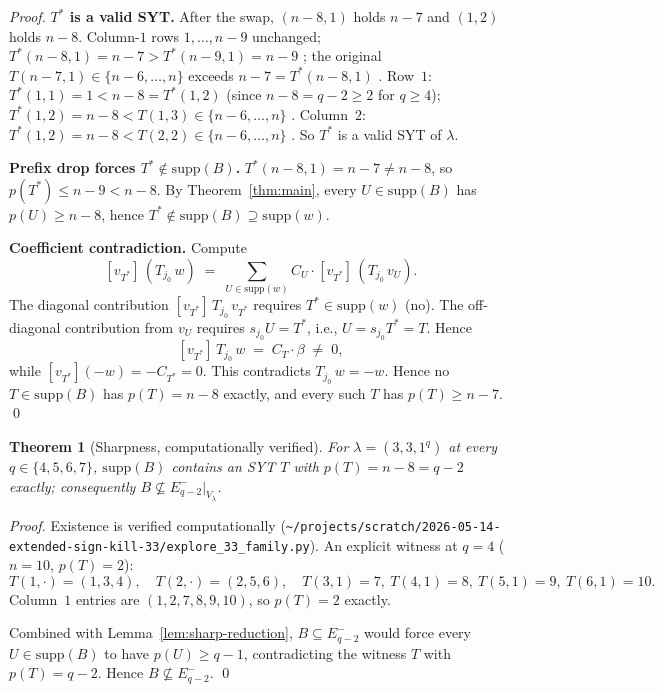 \documentclass[11pt]{article}
\newtheorem{theorem}{Theorem}
\theoremstyle{definition}
\newcommand{\supp}{\mathrm{supp}}
\begin{document}
\begin{proof}
\medskip\textbf{$T^*$ is a valid SYT.}  After the swap, $(n - 8, 1)$
holds $n - 7$ and $(1, 2)$ holds $n - 8$.  Column-$1$ rows $1, \ldots,
n - 9$ unchanged; $T^*(n - 8, 1) = n - 7 > T^*(n - 9, 1) = n - 9$
\checkmark; the original $T(n - 7, 1) \in \{n - 6, \ldots, n\}$ exceeds
$n - 7 = T^*(n - 8, 1)$ \checkmark.  Row~$1$: $T^*(1, 1) = 1 <
n - 8 = T^*(1, 2)$ \checkmark (since $n - 8 = q - 2 \ge 2$ for $q \ge 4$);
$T^*(1, 2) = n - 8 < T(1, 3) \in \{n - 6, \ldots, n\}$ \checkmark.
Column~$2$: $T^*(1, 2) = n - 8 < T(2, 2) \in \{n - 6, \ldots, n\}$
\checkmark.  So $T^*$ is a valid SYT of $\lambda$.

\medskip\textbf{Prefix drop forces $T^* \notin \supp(B)$.}
$T^*(n - 8, 1) = n - 7 \ne n - 8$, so $p(T^*) \le n - 9 < n - 8$.  By
Theorem~\ref{thm:main}, every $U \in \supp(B)$ has $p(U) \ge n - 8$,
hence $T^* \notin \supp(B) \supseteq \supp(w)$.

\medskip\textbf{Coefficient contradiction.}  Compute
\[
   [v_{T^*}]\,(T_{j_0}\,w)
   \;=\; \sum_{U \in \supp(w)} C_U \cdot [v_{T^*}]\,(T_{j_0}\,v_U).
\]
The diagonal contribution $[v_{T^*}]\,T_{j_0}\,v_{T^*}$ requires $T^*
\in \supp(w)$ (no).  The off-diagonal contribution from $v_U$ requires
$s_{j_0} U = T^*$, i.e., $U = s_{j_0} T^* = T$.  Hence
\[
   [v_{T^*}]\,T_{j_0}\,w \;=\; C_T \cdot \beta \;\ne\; 0,
\]
while $[v_{T^*}](-w) = -C_{T^*} = 0$.  This contradicts
$T_{j_0}\,w = -w$.  Hence no $T \in \supp(B)$ has $p(T) = n - 8$
exactly, and every such $T$ has $p(T) \ge n - 7$.
\qed
\end{proof}

\begin{theorem}[Sharpness, computationally verified]\label{thm:sharp}
For $\lambda = (3, 3, 1^q)$ at every $q \in \{4, 5, 6, 7\}$,
$\supp(B)$ contains an SYT $T$ with $p(T) = n - 8 = q - 2$ exactly;
consequently $B \not\subseteq E_{q-2}^-|_{V_\lambda}$.
\end{theorem}

\begin{proof}
Existence is verified computationally
(\texttt{\textasciitilde/projects/scratch/2026-05-14-extended-sign-kill-33/explore\_33\_family.py}).
An explicit witness at $q = 4$ ($n = 10$, $p(T) = 2$):
\[
   T(1, \cdot) = (1, 3, 4),\quad
   T(2, \cdot) = (2, 5, 6),\quad
   T(3, 1) = 7,\ T(4, 1) = 8,\ T(5, 1) = 9,\ T(6, 1) = 10.
\]
Column~$1$ entries are $(1, 2, 7, 8, 9, 10)$, so $p(T) = 2$ exactly.

Combined with Lemma~\ref{lem:sharp-reduction}, $B \subseteq E_{q-2}^-$
would force every $U \in \supp(B)$ to have $p(U) \ge q - 1$, contradicting
the witness $T$ with $p(T) = q - 2$.  Hence $B \not\subseteq E_{q-2}^-$.
\qed
\end{proof}
\end{document}
